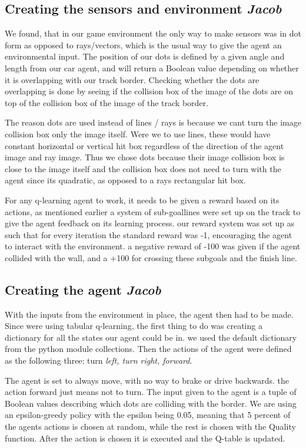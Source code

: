 \subsection{Creating the sensors and environment \small\textit{Jacob}} 
We found, that in our game environment the only way to make sensors was in dot form as opposed to rays/vectors, which is the usual way to give the agent an environmental input. The position of our dots is defined by a given angle and length from our car agent, and will return a Boolean value depending on whether it is overlapping with our track border. Checking whether the dots are overlapping is done by seeing if the collision box of the image of the dots are on top of the collision box of the image of the track border. 

The reason dots are used instead of lines / rays is because we cant turn the image collision box only the image itself. Were we to use lines, these would have constant horizontal or vertical hit box regardless of the direction of the agent image and ray image. Thus we chose dots because their image collision box is close to the image itself and the collision box does not need to turn with the agent since its quadratic, as opposed to a rays rectangular hit box.

For any q-learning agent to work, it needs to be given a reward based on its actions, as mentioned earlier a system of sub-goallines were set up on the track to give the agent feedback on its learning process. our reward system was set up as such that for every iteration the standard reward was -1, encouraging the agent to interact with the environment. a negative reward of -100 was given if the agent collided with the wall, and a +100 for crossing these subgoals and the finish line.

\subsection{Creating the agent \small\textit{Jacob}}
With the inputs from the environment in place, the agent then had to be made. Since were using tabular q-learning, the first thing to do was creating a dictionary for all the states our agent could be in. we used the default dictionary from the python module collections. Then the actions of the agent were defined as the following three: turn \textit{left, turn right, forward}. 

The agent is set to always move, with no way to brake or drive backwards. the action forward just means not to turn. The input given to the agent is a tuple of Boolean values describing which dots are colliding with the border. We are using an epsilon-greedy policy with the epsilon being 0.05, meaning that 5 percent of the agents actions is chosen at random, while the rest is chosen with the Quality function. After the action is chosen it is executed and the Q-table is updated. 


